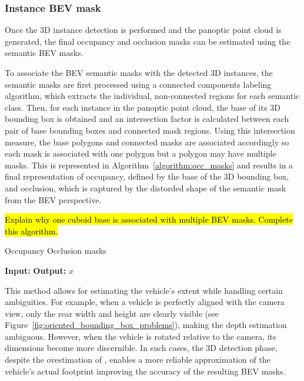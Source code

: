\subsubsection{Instance BEV mask}
Once the 3D instance detection is performed and the panoptic point cloud is generated, the final occupancy and occlusion masks can be estimated using the semantic BEV masks.

To associate the BEV semantic masks with the detected 3D instances, the semantic masks are first processed using a connected components labeling algorithm, which extracts the individual, non-connected regions for each semantic class. Then, for each instance in the panoptic point cloud, the base of its 3D bounding box is obtained and an intersection factor is calculated between each pair of base bounding boxes and connected mask regions. Using this intersection measure, the base polygons and connected masks are associated accordingly so each mask is associated with one polygon but a polygon may have multiple masks. This is represented in Algorithm~\ref{algorithm:occ_masks} and results in a final representation of occupancy, defined by the base of the 3D bounding box, and occlusion, which is captured by the distorded shape of the semantic mask from the BEV perspective.

\hl{Explain why one cuboid base is associated with multiple BEV masks. Complete this algorithm.}
\begin{algorithm}
    \caption{Occupancy Occlusion masks}
    \label{algorithm:occ_masks}
    \footnotesize

    \begin{algorithmic}[1]
        \State \textbf{Input:} 
        \State \textbf{Output:} 
        \State \Return $x$
    \end{algorithmic}
\end{algorithm}

This method allows for estimating the vehicle’s extent while handling certain ambiguities. For example, when a vehicle is perfectly aligned with the camera view, only the rear width and height are clearly visible (see Figure~\ref{fig:oriented_bounding_box_problems}), making the depth estimation ambiguous. However, when the vehicle is rotated relative to the camera, its dimensions become more discernible. In such cases, the 3D detection phase, despite the ovestimation of , enables a more reliable approximation of the vehicle's actual footprint improving the accuracy of the resulting BEV masks.

